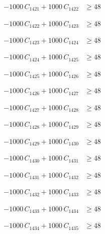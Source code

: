 \documentclass[a4paper,11pt]{article}
\begin{document}
\begin{align}
-1000\,C_{1421} + 1000\,C_{1422} &\geq 48 \nonumber
\end{align}

\begin{align}
-1000\,C_{1422} + 1000\,C_{1423} &\geq 48 \nonumber
\end{align}

\begin{align}
-1000\,C_{1423} + 1000\,C_{1424} &\geq 48 \nonumber
\end{align}

\begin{align}
-1000\,C_{1424} + 1000\,C_{1425} &\geq 48 \nonumber
\end{align}

\begin{align}
-1000\,C_{1425} + 1000\,C_{1426} &\geq 48 \nonumber
\end{align}

\begin{align}
-1000\,C_{1426} + 1000\,C_{1427} &\geq 48 \nonumber
\end{align}

\begin{align}
-1000\,C_{1427} + 1000\,C_{1428} &\geq 48 \nonumber
\end{align}

\begin{align}
-1000\,C_{1428} + 1000\,C_{1429} &\geq 48 \nonumber
\end{align}

\begin{align}
-1000\,C_{1429} + 1000\,C_{1430} &\geq 48 \nonumber
\end{align}

\begin{align}
-1000\,C_{1430} + 1000\,C_{1431} &\geq 48 \nonumber
\end{align}

\begin{align}
-1000\,C_{1431} + 1000\,C_{1432} &\geq 48 \nonumber
\end{align}

\begin{align}
-1000\,C_{1432} + 1000\,C_{1433} &\geq 48 \nonumber
\end{align}

\begin{align}
-1000\,C_{1433} + 1000\,C_{1434} &\geq 48 \nonumber
\end{align}

\begin{align}
-1000\,C_{1434} + 1000\,C_{1435} &\geq 48 \nonumber
\end{align}
\end{document}
